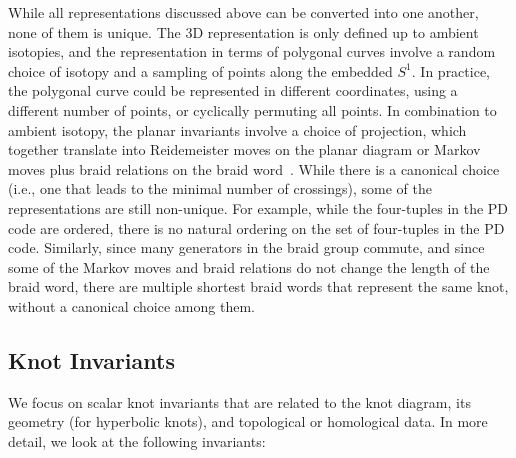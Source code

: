 \documentclass[11pt]{article}
\numberwithin{equation}{section}
\begin{document}
While all representations discussed above can be converted into one another, none of them is unique. The 3D representation is only defined up to ambient isotopies, and the representation in terms of polygonal curves involve a random choice of isotopy and a sampling of points along the embedded $S^1$. In practice, the polygonal curve could be represented in different coordinates, using a different number of points, or cyclically permuting all points. In combination to ambient isotopy, the planar invariants involve a choice of projection, which together translate into Reidemeister moves on the planar diagram or Markov moves plus braid relations on the braid word~\cite{Markov:1935aaa}. While there is a canonical choice (i.e., one that leads to the minimal number of crossings), some of the representations are still non-unique. For example, while the four-tuples in the PD code are ordered, there is no natural ordering on the set of four-tuples in the PD code. Similarly, since many generators in the braid group commute, and since some of the Markov moves and braid relations do not change the length of the braid word, there are multiple shortest braid words that represent the same knot, without a canonical choice among them.


\subsection{Knot Invariants}
\label{sec:Dataset}
We focus on scalar knot invariants that are related to the knot diagram, its geometry (for hyperbolic knots), and topological or homological data. In more detail, we look at the following invariants:
\end{document}
